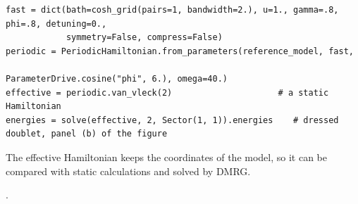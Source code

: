 \begin{incode}
\begin{lstlisting}[frame=none,backgroundcolor={},aboveskip=0pt,belowskip=0pt]
fast = dict(bath=cosh_grid(pairs=1, bandwidth=2.), u=1., gamma=.8, phi=.8, detuning=0.,
            symmetry=False, compress=False)
periodic = PeriodicHamiltonian.from_parameters(reference_model, fast,
                                               ParameterDrive.cosine("phi", 6.), omega=40.)
effective = periodic.van_vleck(2)                     # a static Hamiltonian
energies = solve(effective, 2, Sector(1, 1)).energies    # dressed doublet, panel (b) of the figure
\end{lstlisting}
The effective Hamiltonian keeps the coordinates of the model, so it can be compared with
static calculations and solved by DMRG.
\par\smallskip{}.
\end{incode}

